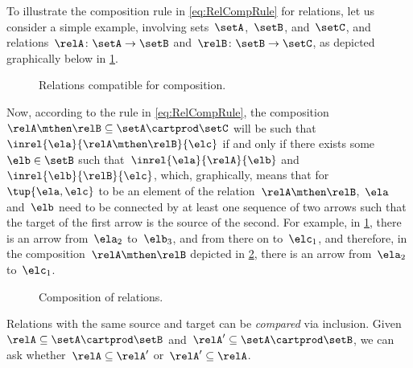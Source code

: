 To illustrate the composition rule in \cref{eq:RelCompRule} for relations, let us consider a simple example, involving sets~$\setA$,~$\setB$, and~$\setC$, and relations~$\relA \colon \setA \to \setB$ and~$\relB \colon \setB \to \setC$, as depicted graphically below in \cref{fig:example_rel_composable}.
%
\begin{figure}[h!]
    \centering
    \caption{Relations compatible for composition.}
    \label{fig:example_rel_composable}
\end{figure}
%
Now, according to the rule in \cref{eq:RelCompRule}, the composition~$\relA \mthen \relB \subseteq \setA \cartprod \setC$ will be such that~$\inrel{\ela}{\relA \mthen \relB}{\elc}$ if and only if there exists some~$\elb \in \setB$ such that~$\inrel{\ela}{\relA}{\elb}$ and~$\inrel{\elb}{\relB}{\elc}$, which, graphically, means that for~$\tup{\ela,\elc}$ to be an element of the relation~$\relA \mthen \relB$,~$\ela$ and~$\elb$ need to be connected by at least one sequence of two arrows such that the target of the first arrow is the source of the second.
For example, in \cref{fig:example_rel_composable}, there is an arrow from~$\ela_2$ to~$\elb_3$, and from there on to~$\elc_1$, and therefore, in the composition~$\relA \mthen \relB$ depicted in \cref{fig:example_rel_composed}, there is an arrow from~$\ela_2$ to~$\elc_1$.
%
\begin{figure}[h!]
    \centering
    \caption{Composition of relations.}
    \label{fig:example_rel_composed}
\end{figure}

\begin{remark}
    Relations with the same source and target can be \emph{compared} via inclusion.
    Given~$\relA \subseteq \setA\cartprod \setB$ and~$\relA'\subseteq \setA\cartprod \setB$, we can ask whether~$\relA\subseteq \relA'$ or~$\relA'\subseteq \relA$.
\end{remark}

